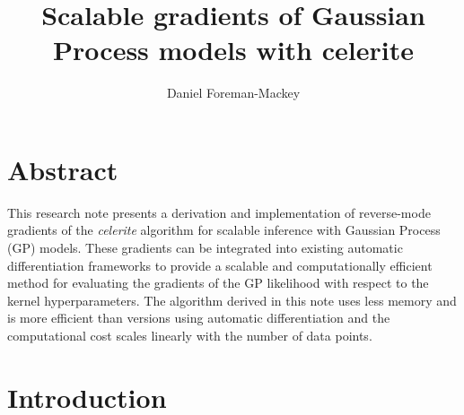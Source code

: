 \documentclass[rnaas]{aastex62}
\begin{document}
\raggedbottom\sloppy\sloppypar\frenchspacing

\title{%
    Scalable gradients of Gaussian Process models with celerite
}

\author[0000-0002-9328-5652]{Daniel Foreman-Mackey}


\section{Abstract}

This research note presents a derivation and implementation of reverse-mode
gradients of the \emph{celerite} algorithm for scalable inference with
Gaussian Process (GP) models.
These gradients can be integrated into existing automatic differentiation
frameworks to provide a scalable and computationally efficient method for
evaluating the gradients of the GP likelihood with respect to the kernel
hyperparameters.
The algorithm derived in this note uses less memory and is more efficient than
versions using automatic differentiation and the computational cost scales
linearly with the number of data points.

\section{Introduction}
\end{document}
